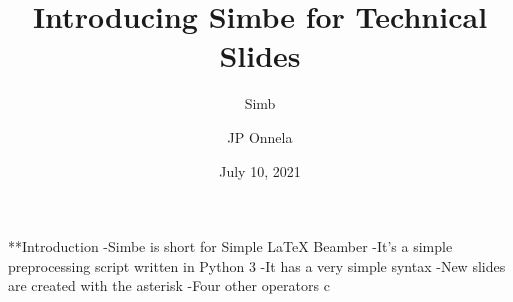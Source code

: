 
\title[SimBe]{Introducing Simbe for Technical Slides}
\subtitle{Simb}
\author[JP Onnela]{JP Onnela}
\date[July 10, 2021]{July 10, 2021}
\frame{\titlepage}

**Introduction
-Simbe is short for Simple LaTeX Beamber
-It's a simple preprocessing script written in Python 3
-It has a very simple syntax
  -New slides are created with the asterisk
  -Four other operators c

